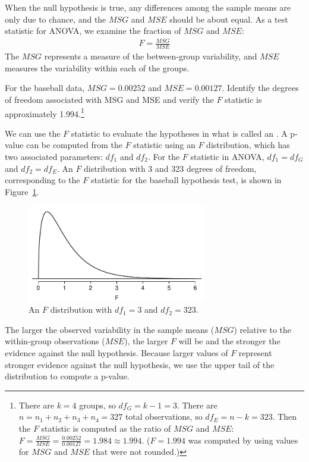When the null hypothesis is true, any differences among the sample means are only due to chance, and the $MSG$ and $MSE$ should be about equal. As a test statistic for ANOVA, we examine the fraction of $MSG$ and $MSE$:
\begin{align} \label{formulaForTheFStatistic}
F = \frac{MSG}{MSE}
\end{align}
The $MSG$ represents a measure of the between-group variability, and $MSE$ measures the variability within each of the groups.

\begin{exercise}
For the baseball data, $MSG = 0.00252$ and $MSE=0.00127$. Identify the degrees of freedom associated with MSG and MSE and verify the $F$ statistic is approximately 1.994.\footnote{There are $k=4$ groups, so $df_{G} = k-1 = 3$. There are $n = n_1 + n_2 + n_3 + n_4 = 327$ total observations, so $df_{E} = n - k = 323$. Then the $F$ statistic is computed as the ratio of $MSG$ and $MSE$: $F = \frac{MSG}{MSE} = \frac{0.00252}{0.00127} = 1.984 \approx 1.994$. ($F=1.994$ was computed by using values for $MSG$ and $MSE$ that were not rounded.)}
\end{exercise}

We can use the $F$ statistic to evaluate the hypotheses in what is called an . A p-value can be computed from the $F$ statistic using an $F$ distribution, which has two associated parameters: $df_{1}$ and $df_{2}$. For the $F$ statistic in ANOVA, $df_{1} = df_{G}$ and $df_{2}= df_{E}$. An $F$ distribution with 3 and 323 degrees of freedom, corresponding to the $F$ statistic for the baseball hypothesis test, is shown in Figure~\ref{fDist3And323}.

\begin{figure}[ht]
\centering
\includegraphics[width=0.7\textwidth]{05/figures/fDist3And323/fDist3And323}
\caption{An $F$ distribution with $df_1=3$ and $df_2=323$.}
\label{fDist3And323}
\end{figure}

The larger the observed variability in the sample means ($MSG$) relative to the within-group observations ($MSE$), the larger $F$ will be and the stronger the evidence against the null hypothesis. Because larger values of $F$ represent stronger evidence against the null hypothesis, we use the upper tail of the distribution to compute a p-value.

